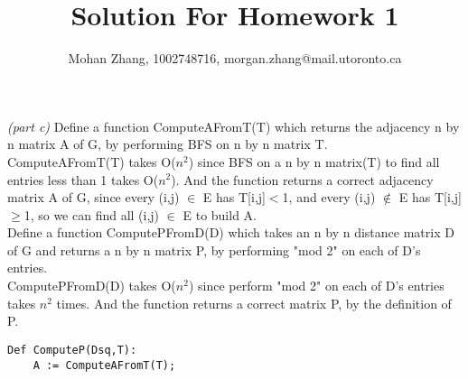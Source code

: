 \documentclass{article}
\title{Solution For Homework 1}
\author{Mohan Zhang, 1002748716, morgan.zhang@mail.utoronto.ca}
\begin{document}
{\noindent\large\it(part c)}
Define a function ComputeAFromT(T) which returns the adjacency n by n matrix A of G, by performing BFS on n by n matrix T.\\
ComputeAFromT(T) takes O($n^2$) since BFS on a n by n matrix(T) to find all entries less than 1 takes O($n^2$). And the function returns a correct adjacency matrix A of G, since every (i,j) $\in$ E has T[i,j]$<$1, and every (i,j) $\notin$ E has T[i,j]$\geq$1, so we can find all (i,j) $\in$ E to build A.\\
Define a function ComputePFromD(D) which takes an n by n distance matrix D of G and returns a n by n matrix P, by performing "mod 2" on each of D's entries.\\
ComputePFromD(D) takes O($n^2$) since perform "mod 2" on each of D's entries takes $n^2$ times. And the function returns a correct matrix P, by the definition of P.\\
\begin{lstlisting}
Def ComputeP(Dsq,T):
	A := ComputeAFromT(T);
\end{lstlisting}
\end{document}
